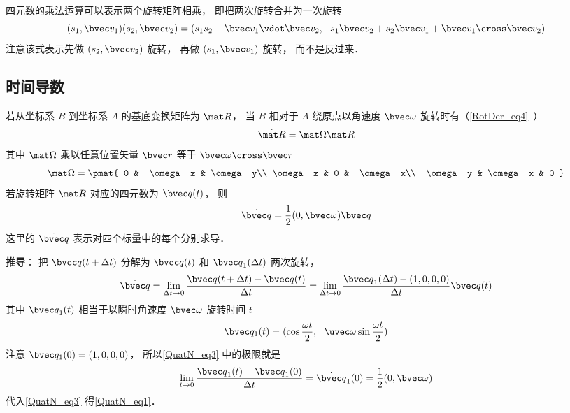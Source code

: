 四元数的乘法运算可以表示两个旋转矩阵相乘， 即把两次旋转合并为一次旋转
\begin{equation}
(s_1, \bvec v_1) (s_2, \bvec v_2) = (s_1 s_2 - \bvec v_1 \vdot \bvec v_2,\ \ s_1 \bvec v_2 + s_2 \bvec v_1 + \bvec v_1 \cross \bvec v_2)
\end{equation}
注意该式表示先做 $(s_2, \bvec v_2)$ 旋转， 再做 $(s_1, \bvec v_1)$ 旋转， 而不是反过来．

\subsection{时间导数}
若从坐标系 $B$ 到坐标系 $A$ 的基底变换矩阵为 $\mat R$， 当 $B$ 相对于 $A$ 绕原点以角速度 $\bvec \omega$ 旋转时有（\autoref{RotDer_eq4}~）
\begin{equation}
\dot{\mat R} = \mat \Omega \mat R
\end{equation}
其中 $\mat\Omega$ 乘以任意位置矢量 $\bvec r$ 等于 $\bvec \omega \cross \bvec r$
\begin{equation}
\mat \Omega = \pmat{
0 & -\omega_z & \omega_y\\
\omega_z & 0 & -\omega_x\\
-\omega_y & \omega_x & 0
}\end{equation}
若旋转矩阵 $\mat R$ 对应的四元数为 $\bvec q(t)$， 则
\begin{equation}\label{QuatN_eq1}
\dot {\bvec q} = \frac12 (0, \bvec \omega) \bvec q
\end{equation}
这里的 $\dot{\bvec q}$ 表示对四个标量中的每个分别求导．

\textbf{推导}： 把 ${\bvec q}(t+\Delta t)$ 分解为 ${\bvec q}(t)$ 和 ${\bvec q}_1(\Delta t)$ 两次旋转， 
\begin{equation}\label{QuatN_eq3}
\dot {\bvec q}
= \lim_{\Delta t\to 0}\frac{{\bvec q}(t+\Delta t) - {\bvec q}(t)}{\Delta t}
= \lim_{\Delta t\to 0}\frac{{\bvec q}_1(\Delta t) - (1,0,0,0)}{\Delta t}\bvec q(t)
\end{equation}
其中 ${\bvec q}_1(t)$ 相当于以瞬时角速度 $\bvec \omega$ 旋转时间 $t$
\begin{equation}
{\bvec q_1}(t) = (\cos\frac{\omega t}{2},\ \ \uvec \omega \sin\frac{\omega t}{2})
\end{equation}
注意 $\bvec q_1(0) = (1,0,0,0)$， 所以\autoref{QuatN_eq3} 中的极限就是
\begin{equation}
\lim_{t\to 0}\frac{{\bvec q}_1(t) - {\bvec q}_1(0)}{\Delta t} = \dot{\bvec q}_1(0) = \frac{1}{2}(0, \bvec\omega)
\end{equation}
代入\autoref{QuatN_eq3} 得\autoref{QuatN_eq1}．
